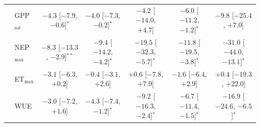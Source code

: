 \begin{table}[htbp]
{\begin{tabular}{llccccc}
\midrule
{} & GPP$_\mathrm{sat}$ & $-4.3$ {\tiny[$-7.9$, $-0.6$]}$^{*}$ & $-4.0$ {\tiny[$-7.3$, $-0.2$]}$^{*}$ & $-4.2$ {\tiny[$-14.0$, $+4.7$]} & $-6.0$ {\tiny[$-11.2$, $-1.2$]}$^{*}$ & $-9.8$ {\tiny[$-25.4$, $+7.0$]} \\
 & NEP$_\mathrm{max}$ & $-8.3$ {\tiny[$-13.3$, $-2.9$]}$^{**}$ & $-9.4$ {\tiny[$-14.2$, $-4.2$]}$^{*}$ & $-19.5$ {\tiny[$-32.3$, $-5.7$]}$^{*}$ & $-11.8$ {\tiny[$-19.5$, $-3.8$]}$^{*}$ & $-31.0$ {\tiny[$-44.0$, $-13.1$]}$^{*}$ \\
 & ET$_\mathrm{max}$ & $-3.1$ {\tiny[$-6.3$, $+0.2$]} & $-0.4$ {\tiny[$-3.1$, $+2.6$]} & $+0.6$ {\tiny[$-7.8$, $+7.9$]} & $-1.6$ {\tiny[$-6.4$, $+2.9$]} & $+0.4$ {\tiny[$-19.3$, $+22.0$]} \\
 & WUE & $-3.0$ {\tiny[$-7.2$, $+1.6$]} & $-4.3$ {\tiny[$-7.4$, $-1.2$]}$^{*}$ & $-9.2$ {\tiny[$-16.3$, $-2.4$]}$^{*}$ & $-6.7$ {\tiny[$-11.4$, $-1.5$]}$^{*}$ & $-16.9$ {\tiny[$-24.6$, $-6.5$]}$^{*}$ \\
\bottomrule
\end{tabular}}
\end{table}
